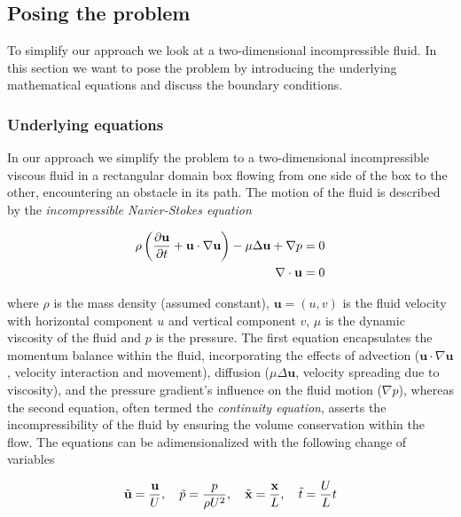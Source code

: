 \subsection{Posing the problem} \label{sec: posingProblem}
To simplify our approach we look at a two-dimensional incompressible fluid. In this section we want to pose the problem by introducing the underlying mathematical equations and discuss the boundary conditions.

\subsubsection*{Underlying equations}
In our approach we simplify the problem to a two-dimensional incompressible viscous fluid in a rectangular domain box flowing from one side of the box to the other, encountering an obstacle in its path. The motion of the fluid is described by the \textit{incompressible Navier-Stokes equation}

\begin{align}
  \rho \left( \frac{\partial \textbf{u}}{\partial t}  + \textbf{u} \cdot \nabla \textbf{u} \right)- \mu \Delta \textbf{u}+ \nabla p =0 \label{eq: incompressNS} \\
  \nabla\cdot \textbf{u} = 0 \notag
\end{align}

where $\rho$ is the mass density (assumed constant), $\textbf{u} = (u,v)$ is the fluid velocity with horizontal component $u$ and vertical component $v$, $\mu$ is the dynamic viscosity of the fluid and $p$ is the pressure. The first equation encapsulates the momentum balance within the fluid, incorporating the effects of advection ($\textbf{u} \cdot \nabla \textbf{u}$, velocity interaction and movement), diffusion ($\mu \Delta \textbf{u}$, velocity spreading due to viscosity), and the pressure gradient's influence on the fluid motion ($\nabla p$), whereas the second equation, often termed the \textit{continuity equation}, asserts the incompressibility of the fluid by ensuring the volume conservation within the flow. The equations can be adimensionalized with the following change of variables

\begin{align}
  \Tilde{\textbf{u}} = \frac{\textbf{u}}{U}, \quad \Tilde{p} = \frac{p}{\rho U^2}, \quad \Tilde{\textbf{x}} = \frac{\textbf{x}}{L}, \quad \Tilde{t} = \frac{U}{L}t
\end{align}

